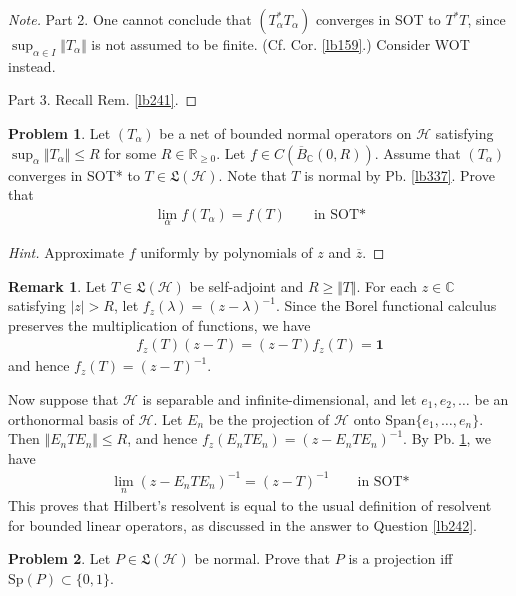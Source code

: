 \documentclass[12pt,b5paper,notitlepage]{article}
\theoremstyle{definition}
\newtheorem{rem}[df]{Remark}
\newtheorem{prob}{\color{red}Problem}[section]
\theoremstyle{plain}
\newcommand{\fk}{\mathfrak}
\newcommand{\ovl}{\overline}
\newcommand{\idt}{\mathbf{1}}
\newcommand{\Span}{\mathrm{Span}}
\newcommand{\Cbb}{\mathbb C}
\newcommand{\Rbb}{\mathbb R}
\newcommand{\Sp}{\mathrm{Sp}}
\newcommand{\MH}{\mathcal H}
\newcommand{\hqed}{\hfill\qedsymbol}
\numberwithin{equation}{section}
\begin{document}
\begin{proof}[Note]
Part 2. One cannot conclude that $(T_\alpha^*T_\alpha)$ converges in SOT to $T^*T$, since $\sup_{\alpha\in I}\Vert T_\alpha\Vert$ is not assumed to be finite. (Cf. Cor. \ref{lb159}.) Consider WOT instead.

Part 3. Recall Rem. \ref{lb241}.
\end{proof}






\begin{prob}\label{lb240}
Let $(T_\alpha)$ be a net of bounded normal operators on $\MH$ satisfying $\sup_\alpha\Vert T_\alpha\Vert\leq R$ for some $R\in\Rbb_{\geq0}$. Let $f\in C(\ovl B_\Cbb(0,R))$. Assume that $(T_\alpha)$ converges in SOT* to $T\in\fk L(\MH)$. Note that $T$ is normal by Pb. \ref{lb337}. Prove that
\begin{align}
\lim_\alpha f(T_\alpha)=f(T)\qquad\text{in SOT*}
\end{align}
\end{prob}

\begin{proof}[Hint]
Approximate $f$ uniformly by polynomials of $z$ and $\ovl z$.
\end{proof}

\begin{rem}\label{lb305}
Let $T\in\fk L(\MH)$ be self-adjoint and $R\geq\Vert T\Vert$. For each $z\in\Cbb$ satisfying $|z|>R$, let $f_z(\lambda)=(z-\lambda)^{-1}$. Since the Borel functional calculus preserves the multiplication of functions, we have
\begin{align*}
f_z(T)(z-T)=(z-T)f_z(T)=\idt
\end{align*}
and hence $f_z(T)=(z-T)^{-1}$. 

Now suppose that $\MH$ is separable and infinite-dimensional, and let $e_1,e_2,\dots$ be an orthonormal basis of $\MH$. Let $E_n$ be the projection of $\MH$ onto $\Span\{e_1,\dots,e_n\}$. Then $\Vert E_nTE_n\Vert\leq R$, and hence $f_z(E_nTE_n)=(z-E_nTE_n)^{-1}$. By Pb. \ref{lb240}, we have
\begin{align*}
\lim_n (z-E_nTE_n)^{-1}=(z-T)^{-1}\qquad \text{in SOT*}
\end{align*}
This proves that Hilbert's resolvent is equal to the usual definition of resolvent for bounded linear operators, as discussed in the answer to Question \ref{lb242}.  \hqed
\end{rem}

\begin{prob}
Let $P\in\fk L(\MH)$ be normal. Prove that $P$ is a projection iff $\Sp(P)\subset\{0,1\}$.
\end{prob}
\end{document}
